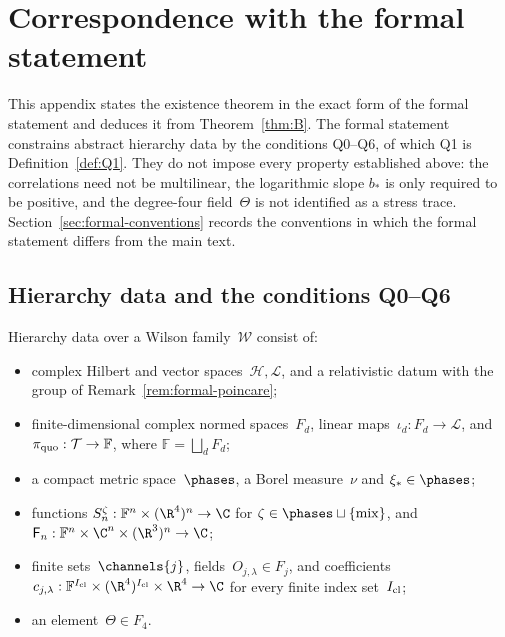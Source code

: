 \section{Correspondence with the formal statement}\label{sec:correspondence}

This appendix states the existence theorem in the exact form of the formal statement and deduces it from Theorem~\ref{thm:B}. The formal statement constrains abstract hierarchy data by the conditions Q0--Q6, of which Q1 is Definition~\ref{def:Q1}. They do not impose every property established above: the correlations need not be multilinear, the logarithmic slope $b_*$ is only required to be positive, and the degree-four field~$\Theta$ is not identified as a stress trace. Section~\ref{sec:formal-conventions} records the conventions in which the formal statement differs from the main text.

\subsection{Hierarchy data and the conditions Q0--Q6}\label{sec:hierarchy-data}

\begin{definition}\label{def:Q0}
Hierarchy data over a Wilson family~$\mathcal W$ consist of:
\begin{itemize}[nosep]
\item complex Hilbert and vector spaces~$\mathcal H,\mathcal L$, and a relativistic datum with the group of Remark~\ref{rem:formal-poincare};
\item finite-dimensional complex normed spaces~$F_d$, linear maps~$\iota_d:F_d\to\mathcal L$, and $\pi_{\rm quo}:\mathcal T\to\mathbb F$, where $\mathbb F=\bigsqcup_dF_d$;
\item a compact metric space~$\phases$, a Borel measure~$\nu$ and $\xi_*\in\phases$;
\item functions $S_n^\zeta:\mathbb F^n\times(\R^4)^n\to\C$ for $\zeta\in\phases\sqcup\{\mathrm{mix}\}$, and $\mathsf F_n:\mathbb F^n\times\C^n\times(\R^3)^n\to\C$;
\item finite sets~$\channels{j}$, fields~$O_{j,\lambda}\in F_j$, and coefficients $c_{j,\lambda}:\mathbb F^{I_{\rm cl}}\times(\R^4)^{I_{\rm cl}}\times\R^4\to\C$ for every finite index set~$I_{\rm cl}$;
\item an element~$\Theta\in F_4$.
\end{itemize}
\end{definition}

